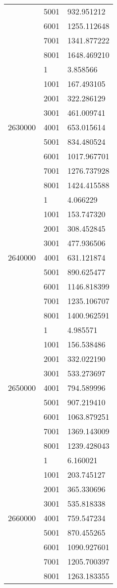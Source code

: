 \begin{table}[htb!]
\begin{tabular}{lll}
 & 5001 & 932.951212 \\
 & 6001 & 1255.112648 \\
 & 7001 & 1341.877222 \\
 & 8001 & 1648.469210 \\
\multirow[c]{9}{*}{2630000} & 1 & 3.858566 \\
 & 1001 & 167.493105 \\
 & 2001 & 322.286129 \\
 & 3001 & 461.009741 \\
 & 4001 & 653.015614 \\
 & 5001 & 834.480524 \\
 & 6001 & 1017.967701 \\
 & 7001 & 1276.737928 \\
 & 8001 & 1424.415588 \\
\multirow[c]{9}{*}{2640000} & 1 & 4.066229 \\
 & 1001 & 153.747320 \\
 & 2001 & 308.452845 \\
 & 3001 & 477.936506 \\
 & 4001 & 631.121874 \\
 & 5001 & 890.625477 \\
 & 6001 & 1146.818399 \\
 & 7001 & 1235.106707 \\
 & 8001 & 1400.962591 \\
\multirow[c]{9}{*}{2650000} & 1 & 4.985571 \\
 & 1001 & 156.538486 \\
 & 2001 & 332.022190 \\
 & 3001 & 533.273697 \\
 & 4001 & 794.589996 \\
 & 5001 & 907.219410 \\
 & 6001 & 1063.879251 \\
 & 7001 & 1369.143009 \\
 & 8001 & 1239.428043 \\
\multirow[c]{9}{*}{2660000} & 1 & 6.160021 \\
 & 1001 & 203.745127 \\
 & 2001 & 365.330696 \\
 & 3001 & 535.818338 \\
 & 4001 & 759.547234 \\
 & 5001 & 870.455265 \\
 & 6001 & 1090.927601 \\
 & 7001 & 1205.700397 \\
 & 8001 & 1263.183355 \\

\end{tabular}
\end{table}
